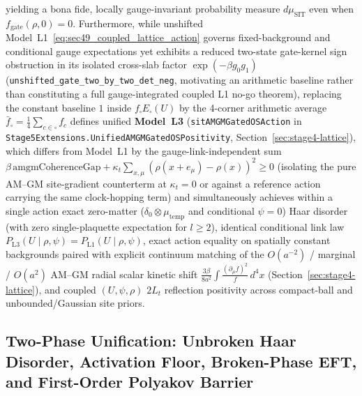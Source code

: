 yielding a bona fide, locally gauge-invariant probability measure $d\mu_{\mathrm{SIT}}$ even when $f_{\mathrm{gate}}(\rho, 0) = 0$. Furthermore, while unshifted Model~L1~\eqref{eq:sec49_coupled_lattice_action} governs fixed-background and conditional gauge expectations yet exhibits a reduced two-state gate-kernel sign obstruction in its isolated cross-slab factor $\exp(-\beta g_0 g_1)$ (\texttt{unshifted\_\allowbreak{}gate\_\allowbreak{}two\_\allowbreak{}by\_\allowbreak{}two\_\allowbreak{}det\_\allowbreak{}neg}, motivating an arithmetic baseline rather than constituting a full gauge-integrated coupled L1 no-go theorem), replacing the constant baseline $1$ inside $f_\square E_\square(U)$ by the 4-corner arithmetic average $\bar{f}_\square = \frac{1}{4}\sum_{c\in\square} f_c$ defines unified \textbf{Model~L3} (\texttt{sitAMGMGatedOSAction} in \texttt{Stage5\allowbreak{}Extensions.\allowbreak{}Unified\allowbreak{}AMGMGated\allowbreak{}OSPositivity}, Section~\ref{sec:stage4-lattice}), which differs from Model~L1 by the gauge-link-independent sum $\beta\,\mathrm{amgmCoherenceGap} + \kappa_t\sum_{x,\mu}(\rho(x+e_\mu)-\rho(x))^2 \ge 0$ (isolating the pure AM--GM site-gradient counterterm at $\kappa_t = 0$ or against a reference action carrying the same clock-hopping term) and simultaneously achieves within a single action exact zero-matter ($\delta_0 \otimes \mu_{\mathrm{temp}}$ and conditional $\psi = 0$) Haar disorder (with zero single-plaquette expectation for $l \ge 2$), identical conditional link law $P_{\mathrm{L3}}(U\mid\rho,\psi) = P_{\mathrm{L1}}(U\mid\rho,\psi)$, exact action equality on spatially constant backgrounds paired with explicit continuum matching of the $O(a^{-2})$ / marginal / $O(a^2)$ AM--GM radial scalar kinetic shift $\frac{3\beta}{8a^2}\int \frac{(\partial_\mu f)^2}{f}\,d^4x$ (Section~\ref{sec:stage4-lattice}), and coupled $(U,\psi,\rho)$ $2L_t$ reflection positivity across compact-ball and unbounded/Gaussian site priors.

\subsection{Two-Phase Unification: Unbroken Haar Disorder, Activation Floor, Broken-Phase EFT, and First-Order Polyakov Barrier}

